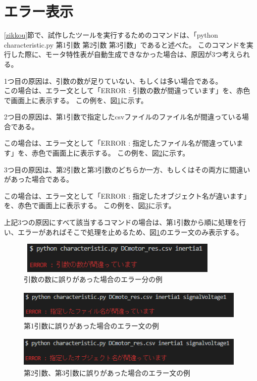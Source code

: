 \section{エラー表示}\label{error}
\ref{zikkou}節で、試作したツールを実行するためのコマンドは、「python characteristic.py 第1引数 第2引数 第3引数」であると述べた。
このコマンドを実行した際に、モータ特性表が自動生成できなかった場合は、原因が3つ考えられる。

1つ目の原因は、引数の数が足りていない、もしくは多い場合である。\\
この場合は、エラー文として「ERROR : 引数の数が間違っています」を、赤色で画面上に表示する。
この例を、図\ref{fig:error_hikisuu}に示す。

2つ目の原因は、第1引数で指定したcsvファイルのファイル名が間違っている場合である。

この場合は、エラー文として「ERROR : 指定したファイル名が間違っています」を、赤色で画面上に表示する。
この例を、図\ref{fig:error_file}に示す。

3つ目の原因は、第2引数と第3引数のどちらか一方、もしくはその両方に間違いがあった場合である。

この場合は、エラー文として「ERROR : 指定したオブジェクト名が違います」を、赤色で画面上に表示する。
この例を、図\ref{fig:error_comand}に示す。

上記3つの原因にすべて該当するコマンドの場合は、第1引数から順に処理を行い、エラーがあればそこで処理を止めるため、図\ref{fig:error_hikisuu}のエラー文のみ表示する。

\begin{figure}[t]
	\centering
	\includegraphics[width=10cm,height=1.5cm]{./Image/error_tarinai.png}
	\caption{引数の数に誤りがあった場合のエラー分の例}
	\label{fig:error_hikisuu}
\end{figure}

\begin{figure}[t]
	\centering
	\includegraphics[width=12cm,height=1.5cm]{./Image/error_file.png}
	\caption{第1引数に誤りがあった場合のエラー文の例}
	\label{fig:error_file}
\end{figure}

\begin{figure}[t]
	\centering
	\includegraphics[width=12cm,height=1.5cm]{./Image/error_comand.png}
	\caption{第2引数、第3引数に誤りがあった場合のエラー文の例}
	\label{fig:error_comand}
\end{figure}